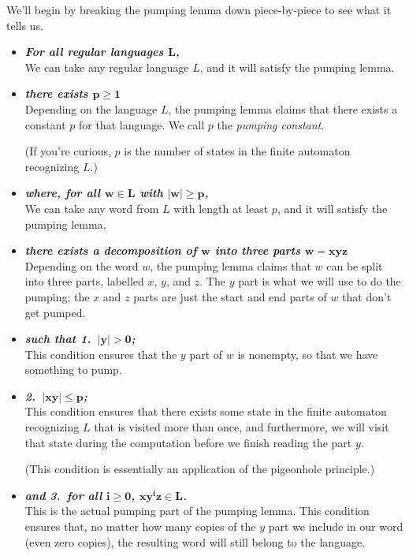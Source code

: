 We'll begin by breaking the pumping lemma down piece-by-piece to see what it tells us.
\begin{colouredbox}
\begin{itemize}
\item \textbf{\textit{For all regular languages $\bm{L}$,}} \\ We can take any regular language $L$, and it will satisfy the pumping lemma.
\item \textbf{\textit{there exists $\bm{p \geq 1}$}} \\ Depending on the language $L$, the pumping lemma claims that there exists a constant $p$ for that language. We call $p$ the \emph{pumping constant}.

(If you're curious, $p$ is the number of states in the finite automaton recognizing $L$.)
\item \textbf{\textit{where, for all $\bm{w \in L}$ with $\bm{|w| \geq p}$,}} \\ We can take any word from $L$ with length at least $p$, and it will satisfy the pumping lemma.
\item \textbf{\textit{there exists a decomposition of $\bm{w}$ into three parts $\bm{w = xyz}$}} \\ Depending on the word $w$, the pumping lemma claims that $w$ can be split into three parts, labelled $x$, $y$, and $z$. The $y$ part is what we will use to do the pumping; the $x$ and $z$ parts are just the start and end parts of $w$ that don't get pumped.
\item \textbf{\textit{such that 1.\ $\bm{|y| > 0}$;}} \\ This condition ensures that the $y$ part of $w$ is nonempty, so that we have something to pump.
\item \textbf{\textit{2.\ $\bm{|xy| \leq p}$;}} \\ This condition ensures that there exists some state in the finite automaton recognizing $L$ that is visited more than once, and furthermore, we will visit that state during the computation before we finish reading the part $y$.

(This condition is essentially an application of the pigeonhole principle.)
\item \textbf{\textit{and 3.\ for all $\bm{i \geq 0}$, $\bm{xy^{i}z \in L}$.}} \\ This is the actual pumping part of the pumping lemma. This condition ensures that, no matter how many copies of the $y$ part we include in our word (even zero copies), the resulting word will still belong to the language.
\end{itemize}
\end{colouredbox}


